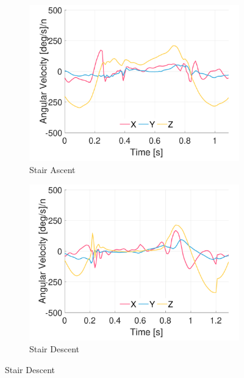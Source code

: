 \begin{figure}[p]
    \begin{subfigure}[b]{0.49\textwidth}
         \centering
         \includegraphics[width=\textwidth]{content/3-Methods/example-data/ch3_example_data_subject_01_r_ankle_gyro_activity_stair_down.pdf}
         \caption{Stair Ascent}
    \end{subfigure}
    \begin{subfigure}[b]{0.49\textwidth}
         \centering
         \includegraphics[width=\textwidth]{content/3-Methods/example-data/ch3_example_data_subject_01_r_ankle_gyro_activity_stair_up.pdf}
         \caption{Stair Descent}
    \end{subfigure}
    

\end{figure}
